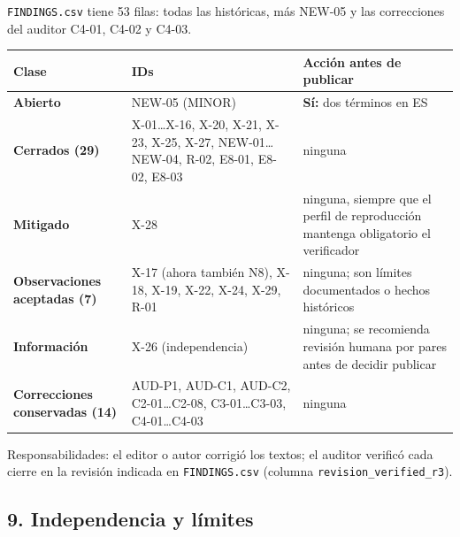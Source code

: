 \documentclass[
]{article}
\newcounter{none} %
\begin{document}
\texttt{FINDINGS.csv} tiene 53 filas: todas las históricas, más NEW-05 y
las correcciones del auditor C4-01, C4-02 y C4-03.

{\def\LTcaptype{none} %
\begin{longtable}[]{@{}lll@{}}
\toprule\noalign{}
Clase & IDs & Acción antes de publicar \\
\midrule\noalign{}
\endhead
\bottomrule\noalign{}
\endlastfoot
\textbf{Abierto} & NEW-05 (MINOR) & \textbf{Sí:} dos términos en ES \\
\textbf{Cerrados (29)} & X-01\ldots X-16, X-20, X-21, X-23, X-25, X-27,
NEW-01\ldots NEW-04, R-02, E8-01, E8-02, E8-03 & ninguna \\
\textbf{Mitigado} & X-28 & ninguna, siempre que el perfil de
reproducción mantenga obligatorio el verificador \\
\textbf{Observaciones aceptadas (7)} & X-17 (ahora también N8), X-18,
X-19, X-22, X-24, X-29, R-01 & ninguna; son límites documentados o
hechos históricos \\
\textbf{Información} & X-26 (independencia) & ninguna; se recomienda
revisión humana por pares antes de decidir publicar \\
\textbf{Correcciones conservadas (14)} & AUD-P1, AUD-C1, AUD-C2,
C2-01\ldots C2-08, C3-01\ldots C3-03, C4-01\ldots C4-03 & ninguna \\
\end{longtable}
}

Responsabilidades: el editor o autor corrigió los textos; el auditor
verificó cada cierre en la revisión indicada en \texttt{FINDINGS.csv}
(columna \texttt{revision\_verified\_r3}).

\subsection{9. Independencia y
límites}\label{9-independencia-y-luxedmites}
\end{document}

